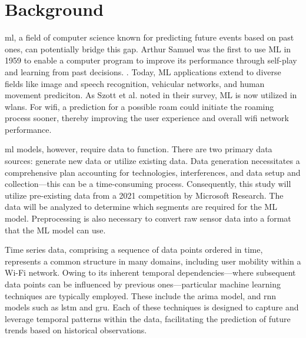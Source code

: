 \chapter{Background}\label{sec:background}

\ac{ml}, a field of computer science known for predicting future events based on past ones, can potentially bridge this gap. 
Arthur Samuel was the first to use ML in 1959 to enable a computer program to improve its performance through self-play and learning from past decisions. \cite{SamuelML}.
Today, ML applications extend to diverse fields like image and speech recognition, vehicular networks\cite{MachineLearningVehicular}, and human movement prediciton\cite{asaharaPedestrianmovementPredictionBased2011}.
As Szott et al. noted in their survey\cite{szottWiFiMeetsML2022}, ML is now utilized in \acp{wlan}.
For \ac{wifi}, a prediction for a possible roam could initiate the roaming process sooner, thereby improving the user experience and overall \ac{wifi} network performance.

\ac{ml} models, however, require data to function. 
There are two primary data sources: generate new data or utilize existing data. 
Data generation necessitates a comprehensive plan accounting for technologies, interferences, and data setup and collection—this can be a time-consuming process. 
Consequently, this study will utilize pre-existing data from a 2021 competition by Microsoft Research\cite{IndoorLocationNavigation}. 
The data will be analyzed to determine which segments are required for the ML model. 
Preprocessing is also necessary to convert raw sensor data into a format that the ML model can use.

Time series data, comprising a sequence of data points ordered in time, represents a common structure in many domains, including user mobility within a Wi-Fi network.
Owing to its inherent temporal dependencies—where subsequent data points can be influenced by previous ones—particular machine learning techniques are typically employed.
These include the \ac{arima} model, and \ac{rnn} models such as \ac{lstm} and \ac{gru}.
Each of these techniques is designed to capture and leverage temporal patterns within the data, facilitating the prediction of future trends based on historical observations.

